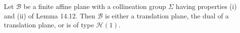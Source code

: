 Let $\mathcal{B}$ be a finite affine plane with a collineation group $\Sigma$ having properties (i) and (ii) of Lemma 14.12. Then $\mathcal{B}$ is either a translation plane, the dual of a translation plane, or is of type $\mathcal{H}(1)$.
